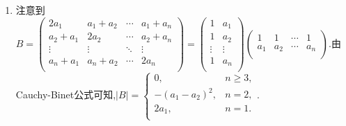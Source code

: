 \documentclass[../../main.tex]{subfiles}
\begin{document}
\begin{solution}
\begin{enumerate}[(1)]
\item 注意到$B=\left( \begin{matrix}
2a_1 & a_1+a_2 & \cdots & a_1+a_n \\
a_2+a_1 & 2a_2 & \cdots & a_2+a_n \\
\vdots & \vdots & \ddots & \vdots \\
a_n+a_1 & a_n+a_2 & \cdots & 2a_n \\
\end{matrix} \right) =\left( \begin{matrix}
1 & a_1 \\
1 & a_2 \\
\vdots & \vdots \\
1 & a_n \\
\end{matrix} \right) \left( \begin{matrix}
1 & 1 & \cdots & 1 \\
a_1 & a_2 & \cdots & a_n \\
\end{matrix} \right)$.由Cauchy-Binet公式可知,$\left| B \right|=\begin{cases}
0, & n\ge 3, \\
-(a_1-a_2)^2, & n=2, \\
2a_1, & n=1. \\
\end{cases}$.


\end{enumerate}
\end{solution}
\end{document}
